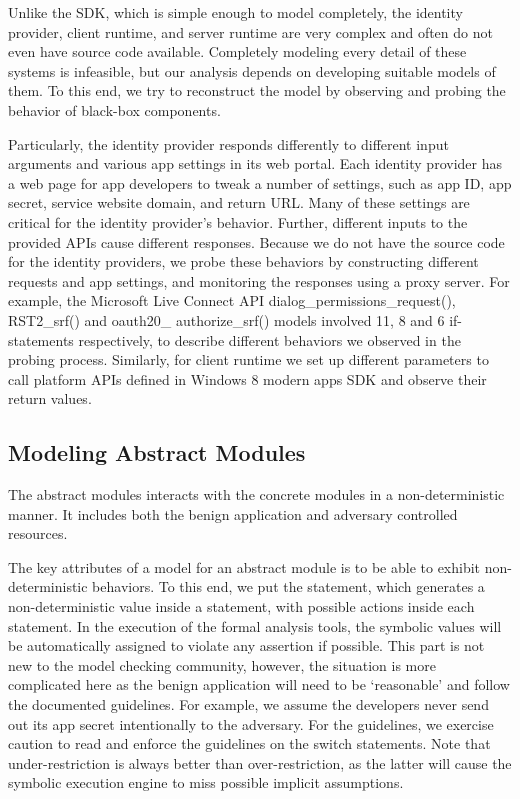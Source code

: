   Unlike the SDK, which is simple enough to model completely, the identity provider, client runtime, and server runtime are very complex and often do not even have source code available.  Completely modeling every detail of these systems is infeasible, but our analysis depends on developing suitable models of them.  To this end, we try to reconstruct the model by observing and probing the behavior of black-box components.  

Particularly, the identity provider responds differently to different input arguments and various app settings in its web portal.  Each identity provider has a web page for app developers to tweak a number of settings, such as app ID, app secret, service website domain, and return URL.  Many of these settings are critical for the identity provider's behavior.  Further, different inputs to the provided APIs cause different responses.  Because we do not have the source code for the identity providers, we probe these behaviors by constructing different requests and app settings, and monitoring the responses using a proxy server.  For example, the Microsoft Live Connect API dialog\_permissions\_request(), RST2\_srf() and oauth20\_ authorize\_srf() models involved 11, 8 and 6 if-statements respectively, to describe different behaviors we observed in the probing process.  Similarly, for client runtime we set up different parameters to call platform APIs defined in Windows 8 modern apps SDK and observe their return values.

\subsection{Modeling Abstract Modules}

The abstract modules interacts with the concrete modules in a non-deterministic manner.  It includes both the benign application and adversary controlled resources.  

 The key attributes of a model for an abstract module is to be able to exhibit non-deterministic behaviors.  To this end, we put the  statement, which generates a non-deterministic value inside a  statement, with possible actions inside each  statement.  In the execution of the formal analysis tools, the symbolic values will be automatically assigned to violate any assertion if possible.  This part is not new to the model checking community, however, the situation is more complicated here as the benign application will need to be `reasonable' and follow the documented guidelines.  For example, we assume the developers never send out its app secret intentionally to the adversary.  For the guidelines, we exercise caution to read and enforce the guidelines on the switch statements.  Note that under-restriction is always better than over-restriction, as the latter will cause the symbolic execution engine to miss possible implicit assumptions. 

